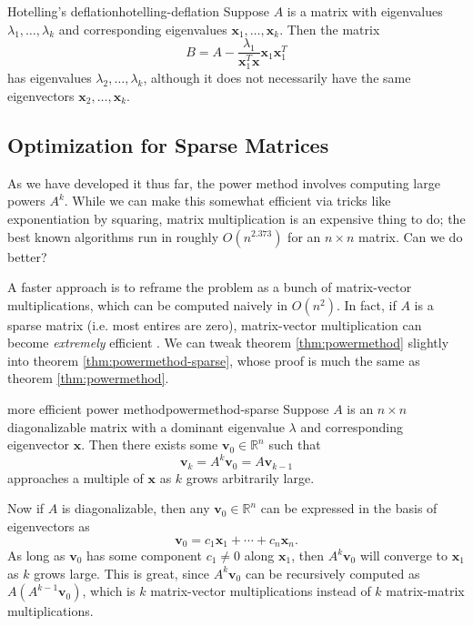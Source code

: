 \documentclass{article}
\let\vec\mathbf
\begin{document}
\begin{theorem}{Hotelling's deflation}{hotelling-deflation}
  Suppose $A$ is a matrix with eigenvalues $\lambda_1, \ldots, \lambda_k$ and corresponding eigenvalues $\vec{x}_1, \ldots, \vec{x}_k$. Then the matrix
  \begin{equation*}
    B = A - \frac{\lambda_1}{\vec{x}_1^T\vec{x}}\vec{x}_1\vec{x}_1^T
  \end{equation*}
  has eigenvalues $\lambda_2, \ldots, \lambda_k$, although it does not necessarily have the same eigenvectors $\vec{x}_2, \ldots, \vec{x}_k$.
\end{theorem}

\subsection{Optimization for Sparse Matrices}
As we have developed it thus far, the power method involves computing large powers $A^k$. While we can make this somewhat efficient via tricks like exponentiation by squaring, matrix multiplication is an expensive thing to do; the best known algorithms run in roughly $O(n^{2.373})$ \cite{matmul} for an $n \times n$ matrix. Can we do better?

A faster approach is to reframe the problem as a bunch of matrix-vector multiplications, which can be computed naively in $O(n^2)$. In fact, if $A$ is a sparse matrix (i.e. most entires are zero), matrix-vector multiplication can become \emph{extremely} efficient \cite{pwr-rot}. We can tweak theorem \ref{thm:powermethod} slightly into theorem \ref{thm:powermethod-sparse}, whose proof is much the same as theorem \ref{thm:powermethod}.

\begin{theorem}{more efficient power method}{powermethod-sparse}
  Suppose $A$ is an $n \times n$ diagonalizable matrix with a dominant eigenvalue $\lambda$ and corresponding eigenvector $\vec{x}$. Then there exists some $\vec{v}_0 \in \mathbb{R}^n$ such that
  \begin{equation*}
    \vec{v}_k = A^k\vec{v}_0 = A\vec{v}_{k-1}
  \end{equation*}
  approaches a multiple of $\vec{x}$ as $k$ grows arbitrarily large.
\end{theorem}

Now if $A$ is diagonalizable, then any $\vec{v}_0 \in \mathbb{R}^n$ can be expressed in the basis of eigenvectors as
\begin{equation*}
  \vec{v}_0 = c_1\vec{x}_1 + \cdots + c_n\vec{x}_n.
\end{equation*}
As long as $\vec{v}_0$ has some component $c_1 \neq 0$ along $\vec{x}_1$, then $A^k\vec{v}_0$ will converge to $\vec{x}_1$ as $k$ grows large. This is great, since $A^k\vec{v}_0$ can be recursively computed as $A(A^{k-1}\vec{v}_0)$, which is $k$ matrix-vector multiplications instead of $k$ matrix-matrix multiplications.
\end{document}
